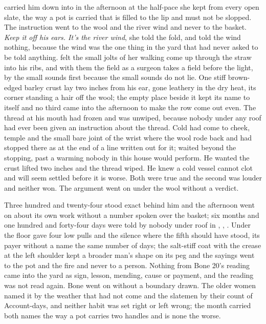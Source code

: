  carried him down into  in the afternoon at the half-pace she kept from every open slate, the way a pot is carried that is filled to the lip and must not be slopped. The instruction went to the wool and the river wind and never to the basket. \emph{Keep it off his ears. It's the river wind}, she told the fold, and told the wind nothing, because the wind was the one thing in the yard that had never asked to be told anything.  felt the small jolts of her walking come up through the straw into his ribs, and with them the field as a surgeon takes a field before the light, by the small sounds first because the small sounds do not lie. One stiff brown-edged barley crust lay two inches from his ear, gone leathery in the dry heat, its corner standing a hair off the wool; the empty place beside it kept its name to itself and no third came into the afternoon to make the row come out even. The thread at his mouth had frozen and was unwiped, because nobody under any roof had ever been given an instruction about the thread. Cold had come to cheek, temple and the small bare joint of the wrist where the wool rode back and had stopped there as at the end of a line written out for it;  waited beyond the stopping, past a warming nobody in this house would perform. He wanted the crust lifted two inches and the thread wiped. He knew a cold vessel cannot clot and will seem settled before it is worse. Both were true and the second was louder and neither won. The argument went on under the wool without a verdict.

Three hundred and twenty-four stood exact behind him and the afternoon went on about its own work without a number spoken over the basket; six months and one hundred and forty-four days were told by nobody under  roof in , , . Under the floor  gave four low pulls and the silence where the fifth should have stood, its payer without a name the same number of days; the salt-stiff coat with the crease at the left shoulder kept a broader man's shape on its peg and the sayings went to the pot and the fire and never to a person. Nothing from Bone 20's reading came into the yard as sign, lesson, mending, cause or payment, and the reading was not read again. Bone went on without a boundary drawn. The older women named it by the weather that had not come and the slatemen by their count of Account-days, and neither habit was set right or left wrong; the month carried both names the way a pot carries two handles and is none the worse.

